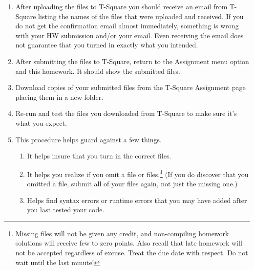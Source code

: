 \documentclass[12pt]{article}
\begin{document}
\begin{enumerate}
\itemsep0em
\item After uploading the files to T-Square you should receive an email from T-Square listing the names of the files that were uploaded and received. If you do not get the confirmation email almost immediately, something is wrong with your HW submission and/or your email. Even receiving the email does not guarantee that you turned in exactly what you intended.
\item After submitting the files to T-Square, return to the Assignment menu option and this homework. It should show the submitted files.
\item Download copies of your submitted files from the T-Square Assignment page placing them in a new folder.
\item Re-run and test the files you downloaded from T-Square to make sure it's what you expect.
\item This procedure helps guard against a few things.
\begin{enumerate}
\itemsep0em
\item It helps insure that you turn in the correct files.
\item It helps you realize if you omit a file or files.\footnote{Missing files will not be given any credit, and non-compiling homework solutions will receive few to zero points. Also recall that late homework will not be accepted regardless of excuse. Treat the due date with respect.  Do not wait until the last minute!}
(If you do discover that you omitted a file, submit all of your files again, not just the missing one.)
\item Helps find syntax errors or runtime errors that you may have added after you last tested your code.
\end{enumerate}
\end{enumerate}
\end{document}
